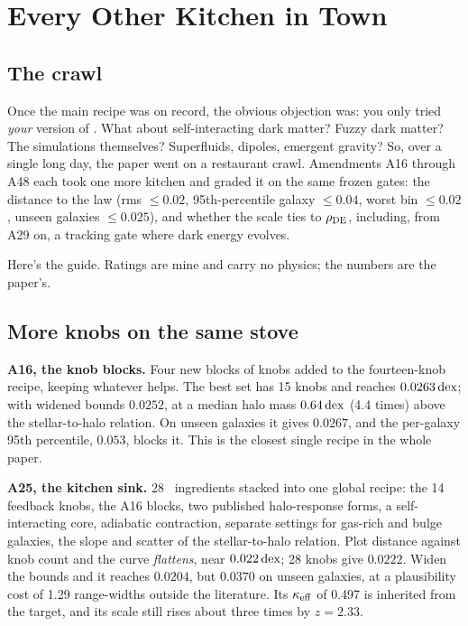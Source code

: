 \chapter{Every Other Kitchen in Town}




\section{The crawl}

Once the main recipe was on record, the obvious objection was: you only tried \emph{your} version of \LCDM. What about self-interacting dark matter? Fuzzy dark matter? The simulations themselves? Superfluids, dipoles, emergent gravity? So, over a single long day, the paper went on a restaurant crawl. Amendments A16 through A48 each took one more kitchen and graded it on the same frozen gates: the distance to the law (rms $\le0.02$, 95th-percentile galaxy $\le0.04$, worst bin $\le0.02$, unseen galaxies $\le0.025$), and whether the scale ties to $\rho_{\rm DE}$, including, from A29 on, a tracking gate where dark energy evolves.

Here's the guide. Ratings are mine and carry no physics; the numbers are the paper's.

\section{More knobs on the same stove}

\textbf{A16, the knob blocks.} Four new blocks of knobs added to the fourteen-knob recipe, keeping whatever helps. The best set has 15 knobs and reaches $0.0263\,\mathrm{dex}$; with widened bounds $0.0252$, at a median halo mass $0.64\,\mathrm{dex}$ (4.4 times) above the stellar-to-halo relation. On unseen galaxies it gives $0.0267$, and the per-galaxy 95th percentile, $0.053$, blocks it. This is the closest single recipe in the whole paper.

\textbf{A25, the kitchen sink.} 28 \LCDM\ ingredients stacked into one global recipe: the 14 feedback knobs, the A16 blocks, two published halo-response forms, a self-interacting core, adiabatic contraction, separate settings for gas-rich and bulge galaxies, the slope and scatter of the stellar-to-halo relation. Plot distance against knob count and the curve \emph{flattens}, near $0.022\,\mathrm{dex}$; 28 knobs give $0.0222$. Widen the bounds and it reaches $0.0204$, but $0.0370$ on unseen galaxies, at a plausibility cost of 1.29 range-widths outside the literature. Its $\kappa_{\rm eff}$ of 0.497 is inherited from the target, and its scale still rises about three times by $z=2.33$.

